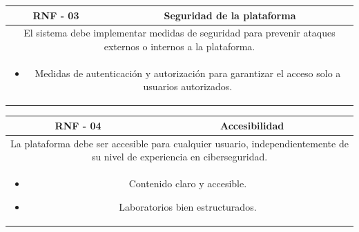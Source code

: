             \begin{table}[!htbp]
                \centering
                \begin{tabular}{|c|c|}
                    \hline
                    \textbf{RNF - 03} & \textbf{Seguridad de la plataforma} \\
                    \hline
                    \multicolumn{2}{|p{15cm}|}{
                        El sistema debe implementar medidas de seguridad para prevenir ataques externos o internos a la plataforma.
                    } \\
                    \hline
                    \multicolumn{2}{|p{15cm}|}{
                        \begin{itemize}
                            \item Medidas de autenticación y autorización para garantizar el acceso solo a usuarios autorizados.
                        \end{itemize}
                        } \\
                    \hline
                \end{tabular}
                \label{tab:RNF3}
            \end{table}
            
            \begin{table}[!htbp]
                \centering
                \begin{tabular}{|c|c|}
                    \hline
                    \textbf{RNF - 04} & \textbf{Accesibilidad} \\
                    \hline
                    \multicolumn{2}{|p{15cm}|}{
                        La plataforma debe ser accesible para cualquier usuario, independientemente de su nivel de experiencia en ciberseguridad.
                    } \\
                    \hline
                    \multicolumn{2}{|p{15cm}|}{
                        \begin{itemize}
                            \item Contenido claro y accesible.
                            \item Laboratorios bien estructurados.
                        \end{itemize}
                        } \\
                    \hline
                \end{tabular}
                \label{tab:RNF4}
            \end{table}
            
